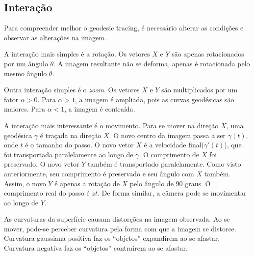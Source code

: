 \subsection{Interação}
Para compreender melhor o geodesic tracing,
é necessário alterar as condições e observar as alterações na imagem.

A interação mais simples é a rotação.
Os vetores $X$ e $Y$ são apenas rotacionados por um ângulo $\theta$.
A imagem resultante não se deforma, apenas é rotacionada pelo mesmo ângulo $\theta$.

Outra interação simples é o \textit{zoom}.
Os vetores $X$ e $Y$ são multiplicados por um fator $\alpha > 0$.
Para $\alpha > 1$, a imagem é ampliada, pois as curvas geodésicas são maiores.
Para $\alpha < 1$, a imagem é contraída.

A interação mais interessante é o movimento.
Para se mover na direção $X$, uma geodésica $\gamma$ é traçada na direção $X$.
O novo centro da imagem passa a ser $\gamma(t)$, onde $t$ é o tamanho do passo.
O novo vetor $X$ é a velocidade final($\gamma'(t)$),
que foi transportada paralelamente ao longo
de $\gamma$. O comprimento de $X$ foi preservado.
O novo vetor $Y$ também é transportado paralelamente.
Como visto anteriormente, seu comprimento é preservado e seu ângulo com $X$ também.
Assim, o novo $Y$ é apenas a rotação de $X$ pelo ângulo de $90$ graus.
O comprimento real do passo é $zt$.
De forma similar, a câmera pode se movimentar ao longo de $Y$.

As curvaturas da superfície causam distorções na imagem observada.
Ao se mover, pode-se perceber curvatura pela forma com que a imagem se distorce.
Curvatura gaussiana positiva faz os ``objetos'' expandirem ao se afastar.
Curvatura negativa faz os ``objetos'' contraírem ao se afastar.